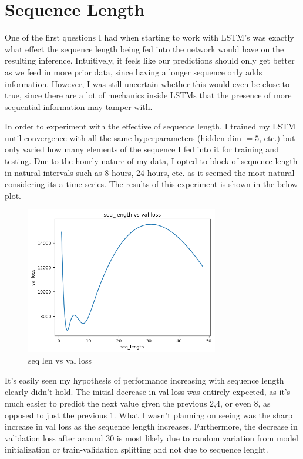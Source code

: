 \documentclass[12pt, twoside]{report}
\begin{document}
\section{Sequence Length}

One of the first questions I had when starting to work with LSTM's was exactly what effect
the sequence length being fed into the network would have on the resulting inference. Intuitively,
it feels like our predictions should only get better as we feed in more prior data, since having a longer
sequence only adds information. However, I was still uncertain whether this would even be close to true,
since there are a lot of mechanics inside LSTMs that the presence of more sequential information may tamper
with.

In order to experiment with the effective of sequence length, I trained my LSTM until convergence with all
the same hyperparameters (hidden dim $= 5$, etc.) but only varied how many elements of the sequence I fed into it
for training and testing. Due to the hourly nature of my data, I opted to block of sequence length in natural intervals
such as 8 hours, 24 hours, etc. as it seemed the most natural considering its a time series. The results of this 
experiment is shown in the below plot.

\begin{figure}[H]
    \centering
    \includegraphics[width=0.75\textwidth]{figures/seq len vs val loss.png}
    \caption*{seq len vs val loss}
\end{figure}

It's easily seen my hypothesis of performance increasing with sequence length clearly didn't hold.
The initial decrease in val loss was entirely expected, as it's much easier to predict the next value
given the previous 2,4, or even 8, as opposed to just the previous 1.
What I wasn't planning on seeing was the sharp increase in val loss as the sequence length increases.
Furthermore, the decrease in validation loss after around 30 is most likely due to random variation from 
model initialization or train-validation splitting and not due to sequence lenght.
\end{document}
